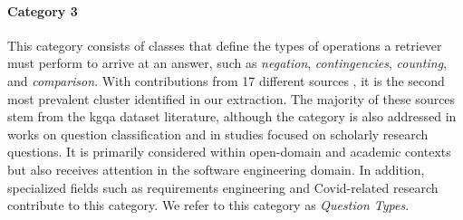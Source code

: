 \label{enum:cluster_3}
\paragraph{Category 3} This category consists of classes that define the types of operations a retriever must perform to arrive at an answer, such as \emph{negation}, \emph{contingencies}, \emph{counting}, and \emph{comparison}. With contributions from 17 different sources \cite{allam_question_2016,sjoberg_future_2007,banerjee_dblp-quad_2023,auer_sciqa_2023,nguyen_ripple_2017,easterbrook_selecting_2008,dillon_classification_1984, ratan_formulation_2019,kamper_types_2020,dubey_lc-quad_2019,usbeck_qald-10_2023,steinmetz_what_2021,tran_comparative_2022,bolotova_non-factoid_2022,jaradeh_question_2020,bordes_large-scale_2015,karras_divide_2023}, it is the second most prevalent cluster identified in our extraction. The majority of these sources stem from the \gls{kgqa} dataset literature, although the category is also addressed in works on question classification and in studies focused on scholarly research questions. It is primarily considered within open-domain and academic contexts but also receives attention in the software engineering domain. In addition, specialized fields such as requirements engineering and Covid-related research contribute to this category. We refer to this category as \emph{Question Types}.


